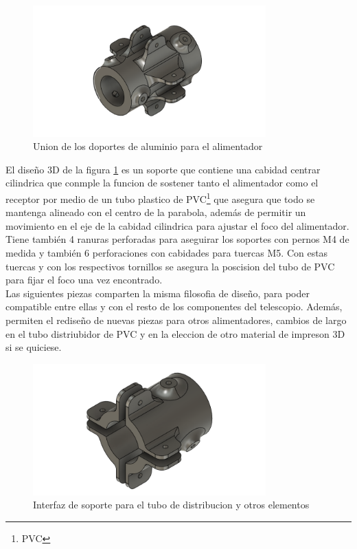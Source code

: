 \begin{figure}
    \centering
    \includegraphics[width=0.8\textwidth]{img/soporte3D5}
    \caption{Union de los doportes de aluminio para el alimentador}
    \label{fig:ensamble4}
\end{figure}

El diseño 3D de la figura \ref{fig:ensamble4} es un soporte que contiene una cabidad centrar cilindrica que conmple la funcion de sostener tanto el alimentador como el receptor por medio de un tubo plastico de PVC\footnote{PVC} que asegura que todo se mantenga alineado con el centro de la parabola, además de permitir un movimiento en el eje de la cabidad cilindrica para ajustar el foco del alimentador.\\

Tiene también 4 ranuras perforadas para aseguirar los soportes con pernos M4 de medida y también 6 perforaciones con cabidades para tuercas M5. Con estas tuercas y con los respectivos tornillos se asegura la poscision del tubo de PVC para fijar el foco una vez encontrado.\\

Las siguientes piezas comparten la misma filosofia de diseño, para poder compatible entre ellas y con el resto de los componentes del telescopio. Además, permiten el rediseño de nuevas piezas para otros alimentadores, cambios de largo en el tubo distriubidor de PVC y en la eleccion de otro material de impreson 3D si se quiciese.\\

\begin{figure}
    \centering
    \includegraphics[width=0.8\textwidth]{img/soporte3D1v1}
    \caption{Interfaz de soporte para el tubo de distribucion y otros elementos}
    \label{fig:ensamble5}
\end{figure}

